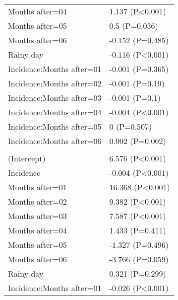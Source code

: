 \documentclass[]{article}
\begin{document}
\begin{longtable}[t]{ll}
\hspace{1em}Months after=04 & 1.137 (P<0.001)\\
\hspace{1em}Months after=05 & 0.5 (P=0.036)\\
\hspace{1em}Months after=06 & -0.152 (P=0.485)\\
\hspace{1em}Rainy day & -0.116 (P<0.001)\\
\hspace{1em}Incidence:Months after=01 & -0.001 (P=0.365)\\
\hspace{1em}Incidence:Months after=02 & -0.001 (P=0.19)\\
\hspace{1em}Incidence:Months after=03 & -0.001 (P=0.1)\\
\hspace{1em}Incidence:Months after=04 & -0.004 (P<0.001)\\
\hspace{1em}Incidence:Months after=05 & 0 (P=0.507)\\
\hspace{1em}Incidence:Months after=06 & 0.002 (P=0.002)\\
\addlinespace[1.5em]
\multicolumn{2}{l}{\textbf{Temporary not field worker}}\\
\hspace{1em}(Intercept) & 6.576 (P<0.001)\\
\hspace{1em}Incidence & -0.004 (P<0.001)\\
\hspace{1em}Months after=01 & 16.368 (P<0.001)\\
\hspace{1em}Months after=02 & 9.382 (P<0.001)\\
\hspace{1em}Months after=03 & 7.587 (P<0.001)\\
\hspace{1em}Months after=04 & 1.433 (P=0.411)\\
\hspace{1em}Months after=05 & -1.327 (P=0.496)\\
\hspace{1em}Months after=06 & -3.766 (P=0.059)\\
\hspace{1em}Rainy day & 0.321 (P=0.299)\\
\hspace{1em}Incidence:Months after=01 & -0.026 (P<0.001)\\

\end{longtable}
\end{document}
